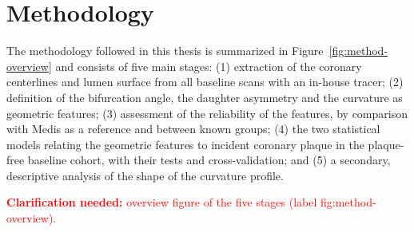 \providecommand{\clarify}[1]{\textcolor{red}{\textbf{Clarification needed:} #1}}
\chapter{Methodology}
\label{ch:methodology}

The methodology followed in this thesis is summarized in Figure~\ref{fig:method-overview} and consists of five main stages:
(1) extraction of the coronary centerlines and lumen surface from all baseline scans with an in-house tracer;
(2) definition of the bifurcation angle, the daughter asymmetry and the curvature as geometric features;
(3) assessment of the reliability of the features, by comparison with Medis as a reference and between known groups;
(4) the two statistical models relating the geometric features to incident coronary plaque in the plaque-free baseline cohort, with their tests and cross-validation;
and (5) a secondary, descriptive analysis of the shape of the curvature profile.

\clarify{overview figure of the five stages (label fig:method-overview).}
